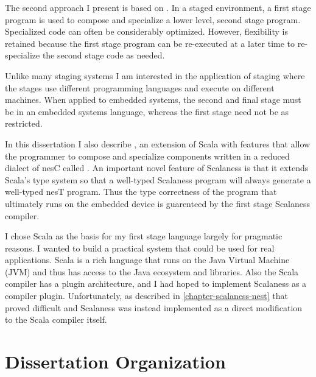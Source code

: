 The second approach I present is based on 
\cite{Taha-MetaML,Sheard-TemplateHaskell,Mainland-Flask-2008,FramedML}. In a staged environment,
a first stage program is used to compose and specialize a lower level, second stage program.
Specialized code can often be considerably optimized. However, flexibility is retained because
the first stage program can be re-executed at a later time to re-specialize the second stage
code as needed.

Unlike many staging systems I am interested in the application of staging where the stages use
different programming languages and execute on different machines. When applied to embedded
systems, the second and final stage must be in an embedded systems language, whereas the first
stage need not be as restricted.

In this dissertation I also describe  \cite{chapin-GPCE-2013}, an extension
of Scala \cite{PiS2} with features that allow the programmer to compose and specialize
components written in a reduced dialect of nesC called . An important novel
feature of Scalaness is that it extends Scala's type system so that a well-typed Scalaness
program will always generate a well-typed nesT program. Thus the type correctness of the program
that ultimately runs on the embedded device is guarenteed by the first stage Scalaness compiler.

I chose Scala as the basis for my first stage language largely for pragmatic reasons. I wanted
to build a practical system that could be used for real applications. Scala is a rich language
that runs on the Java Virtual Machine (JVM) and thus has access to the Java ecosystem and
libraries. Also the Scala compiler has a plugin architecture, and I had hoped to implement
Scalaness as a compiler plugin. Unfortunately, as described in \autoref{chapter-scalaness-nest}
that proved difficult and Scalaness was instead implemented as a direct modification to the
Scala compiler itself.

\section{Dissertation Organization}

